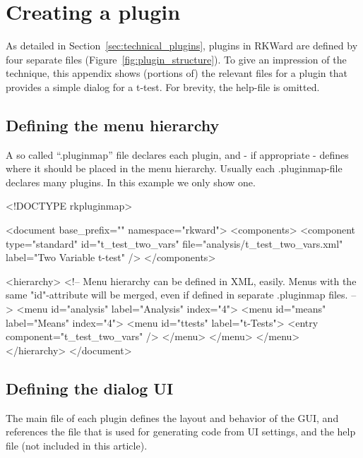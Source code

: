 \section{Creating a plugin}
\label{sec:example_plugin}
As detailed in Section~\ref{sec:technical_plugins}, plugins in RKWard are
defined by four separate files (Figure~\ref{fig:plugin_structure}). To give an impression of the technique,
this appendix shows (portions of) the relevant files for a plugin that provides
a simple dialog for a t-test. For brevity, the help-file is omitted.

\subsection{Defining the menu hierarchy}
A so called ``.pluginmap'' file declares each plugin, and - if appropriate - defines where it should
be placed in the menu hierarchy. Usually each .pluginmap-file declares many plugins. In this example
we only show one.

\begin{Code}
<!DOCTYPE rkpluginmap>

<document base_prefix="" namespace="rkward">
  <components>
    <component type="standard" id="t_test_two_vars" file="analysis/t_test_two_vars.xml" label="Two Variable t-test" />
  </components>

  <hierarchy>
    <!-- Menu hierarchy can be defined in XML, easily.
    Menus with the same "id"-attribute will be merged, even if defined in
    separate .pluginmap files. -->
    <menu id="analysis" label="Analysis" index="4">
      <menu id="means" label="Means" index="4">
        <menu id="ttests" label="t-Tests">
          <entry component="t_test_two_vars" />
        </menu>
      </menu>
    </menu>
  </hierarchy>
</document>
\end{Code}

\subsection {Defining the dialog UI}
The main  file of each plugin defines the layout and behavior of the GUI, and references the
 file that is used for generating  code from UI settings, and the help file (not included in this article).

